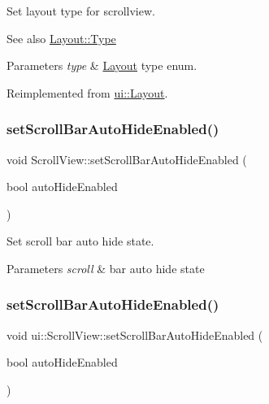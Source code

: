 Set layout type for scrollview.

\begin{DoxySeeAlso}{See also}
{\ttfamily \hyperlink{classui_1_1Layout_aecabbc1592677eadd6757edc1df5b952}{Layout\+::\+Type}} 
\end{DoxySeeAlso}

\begin{DoxyParams}{Parameters}
{\em type} & \hyperlink{classui_1_1Layout}{Layout} type enum. \\
\hline
\end{DoxyParams}


Reimplemented from \hyperlink{classui_1_1Layout_a79c8c32f381022f2da2984b6f03d711c}{ui\+::\+Layout}.

\mbox{\label{classui_1_1ScrollView_ad6b0c4ac3193fe18e80c3afeddf6dd9b}} 
\subsubsection{\texorpdfstring{set\+Scroll\+Bar\+Auto\+Hide\+Enabled()}{setScrollBarAutoHideEnabled()}\hspace{0.1cm}{\footnotesize\ttfamily [1/2]}}
{\footnotesize\ttfamily void Scroll\+View\+::set\+Scroll\+Bar\+Auto\+Hide\+Enabled (\begin{DoxyParamCaption}\item[{bool}]{auto\+Hide\+Enabled }\end{DoxyParamCaption})}



Set scroll bar auto hide state. 


\begin{DoxyParams}{Parameters}
{\em scroll} & bar auto hide state \\
\hline
\end{DoxyParams}
\mbox{\label{classui_1_1ScrollView_a321ebc787e52091acd98786f3d1fad08}} 
\subsubsection{\texorpdfstring{set\+Scroll\+Bar\+Auto\+Hide\+Enabled()}{setScrollBarAutoHideEnabled()}\hspace{0.1cm}{\footnotesize\ttfamily [2/2]}}
{\footnotesize\ttfamily void ui\+::\+Scroll\+View\+::set\+Scroll\+Bar\+Auto\+Hide\+Enabled (\begin{DoxyParamCaption}\item[{bool}]{auto\+Hide\+Enabled }\end{DoxyParamCaption})}



